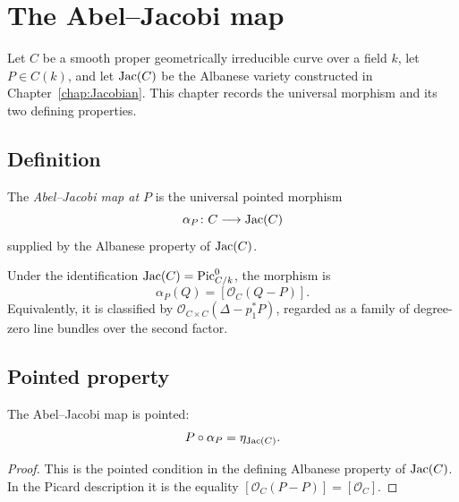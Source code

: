 \chapter{The Abel--Jacobi map}
\label{chap:AbelJacobi}

Let \(C\) be a smooth proper geometrically irreducible curve over a field \(k\),
let \(P \in C(k)\), and let \(\mathrm{Jac}(C)\) be the Albanese variety constructed in
Chapter~\ref{chap:Jacobian}.  This chapter records the universal morphism and its
two defining properties.

\section{Definition}

\begin{definition}\leanok
  \label{def:ofCurve}
  The \emph{Abel--Jacobi map at \(P\)} is the universal pointed morphism
  \[
    \alpha_P \colon C \longrightarrow \mathrm{Jac}(C)
  \]
  supplied by the Albanese property of \(\mathrm{Jac}(C)\).
\end{definition}

\begin{remark}
  \label{rem:ofCurve_classical}
  Under the identification \(\mathrm{Jac}(C) = \operatorname{Pic}^0_{C/k}\), the morphism is
  \[
    \alpha_P(Q) = [\mathcal O_C(Q-P)].
  \]
  Equivalently, it is classified by
  \(\mathcal O_{C\times C}(\Delta-p_1^*P)\), regarded as a family of
  degree-zero line bundles over the second factor.
\end{remark}

\section{Pointed property}

\begin{lemma}\leanok
  \label{lem:comp_ofCurve}
  The Abel--Jacobi map is pointed:
  \[
    P \circ \alpha_P = \eta_{\mathrm{Jac}(C)}.
  \]
\end{lemma}

\begin{proof}
  This is the pointed condition in the defining Albanese property of
  \(\mathrm{Jac}(C)\).  In the Picard description it is the equality
  \([\mathcal O_C(P-P)] = [\mathcal O_C]\).
\end{proof}

